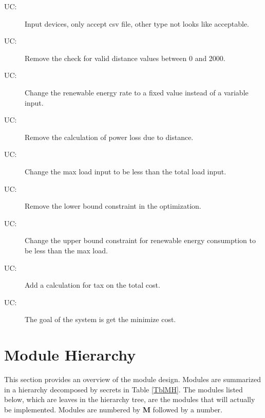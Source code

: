 \documentclass[12pt]{article}
\newcounter{ucnum}
\newcommand{\uctheucnum}{UC\theucnum}
\begin{document}
\begin{description}
\item[ \uctheucnum \label{ucIO}:] Input devices, only accept csv file, other type not looks like acceptable.
\item[ \uctheucnum \label{ucInput}:] Remove the check for valid distance values between 0 and 2000.
\item[ \uctheucnum \label{ucOutput}:] Change the renewable energy rate to a fixed value instead of a variable input.
\item[ \uctheucnum \label{ucGoal}:] Remove the calculation of power loss due to distance.
\item[ \uctheucnum \label{ucODEstructure}:] Change the max load input to be less than the total load input.
\item[ \uctheucnum \label{ucEnergyStructure}:] Remove the lower bound constraint in the optimization.
\item[ \uctheucnum \label{ucEnergyStructure}:] Change the upper bound constraint for renewable energy consumption to be less than the max load.
\item[ \uctheucnum \label{ucEnergyStructure}:] Add a calculation for tax on the total cost.
\item[ \uctheucnum \label{ucEnergyStructure}:] The goal of the system is get the minimize cost.
\end{description}

\section{Module Hierarchy} \label{SecMH}

This section provides an overview of the module design. Modules are summarized
in a hierarchy decomposed by secrets in Table \ref{TblMH}. The modules listed
below, which are leaves in the hierarchy tree, are the modules that will
actually be implemented. Modules are numbered by \textbf{M}
followed by a number. 
\end{document}
